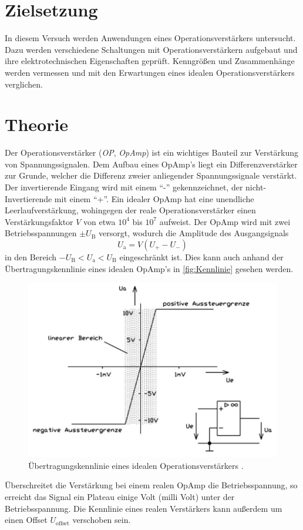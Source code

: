 \section{Zielsetzung}
In diesem Versuch werden Anwendungen eines Operationsverstärkers untersucht.
Dazu werden verschiedene Schaltungen mit Operationsverstärkern aufgebaut und ihre elektrotechnischen Eigenschaften geprüft.
Kenngrößen und Zusammenhänge werden vermessen und mit den Erwartungen eines idealen Operationsverstärkers verglichen.
 
\section{Theorie}
\label{sec:Theorie}
Der Operationsverstärker (\textit{OP}, \textit{OpAmp}) ist ein wichtiges Bauteil zur Verstärkung von Spannungssignalen.
Dem Aufbau eines OpAmp's liegt ein Differenzverstärker zur Grunde, welcher die Differenz zweier anliegender Spannungssignale verstärkt.
Der invertierende Eingang wird mit einem \enquote{-} gekennzeichnet, der nicht-Invertierende mit einem \enquote{+}.
Ein idealer OpAmp hat eine unendliche Leerlaufverstärkung, wohingegen der reale Operationsverstärker einen Verstärkungsfaktor $V$ von etwa $10^4$ bis $10^7$ aufweist.
Der OpAmp wird mit zwei Betriebsspannungen $\pm U_\text{B}$ versorgt, wodurch die Amplitude des Ausgangsignals 
\begin{equation}
    U_\text{a} = V (U_+ - U_-)
    \label{eq:U_a}
\end{equation}
in den Bereich $-U_\text{B} < U_\text{a} < U_\text{B}$ eingeschränkt ist.
Dies kann auch anhand der Übertragungskennlinie eines idealen OpAmp's in \autoref{fig:Kennlinie} gesehen werden.
\begin{figure}
    \centering
    \includegraphics[width = .7\textwidth]{"content/pics/Kennlinie.png"}
    \caption{Übertragungskennlinie eines idealen Operationsverstärkers \cite{Federau2017}.}
    \label{fig:Kennlinie}
\end{figure}
Überschreitet die Verstärkung bei einem realen OpAmp die Betriebsspannung, so erreicht das Signal ein Plateau einige Volt (milli Volt) unter der Betriebsspannung.
Die Kennlinie eines realen Verstärkers kann außerdem um einen Offset $U_\text{offset}$ verschoben sein.

